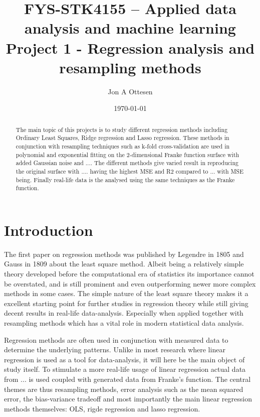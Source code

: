 \documentclass[uio,jmp,amsmath,amssymb,reprint]{revtex4-1}
\numberwithin{equation}{section}
\begin{document}
\title{FYS-STK4155 – Applied data analysis and machine learning\\ Project 1 - Regression analysis and resampling methods}%

\author{Jon A Ottesen}
\date{\today}

\begin{abstract}
The main topic of this projects is to study different regression methods including Ordinary Least Squares, Ridge regression and Lasso regression. These methods in conjunction with resampling techniques such as k-fold cross-validation are used in polynomial and exponential fitting on the 2-dimensional Franke function surface with added Gaussian noise and .... The different methods give varied result in reproducing the original surface with .... having the highest MSE and R2 compared to ... with MSE being. Finally real-life data is the analysed using the same techniques as the Franke function.

\end{abstract}

\maketitle


\section{Introduction}\label{sec:Introduction}

The first paper on regression methods was published by Legendre in 1805 and Gauss in 1809 about the least square method\cite{wiki:Regression_analysis}. Albeit being a relatively simple theory developed before the computational era of statistics its importance cannot be overstated, and is still prominent and even outperforming newer more complex methods in some cases. The simple nature of the least square theory makes it a excellent starting point for further studies in regression theory while still giving decent results in real-life data-analysis. Especially when applied together with resampling methods which has a vital role in modern statistical data analysis.

Regression methods are often used in conjunction with measured data to determine the underlying patterns. Unlike in most research where linear regression is used as a tool for data-analysis, it will here be the main object of study itself. To stimulate a more real-life usage of linear regression actual data from ... is used coupled with generated data from  Franke's function. The central themes are thus resampling methods, error analysis such as the mean squared error, the bias-variance tradeoff and most importantly the main linear regression methods themselves: OLS, rigde regression and lasso regression.
\end{document}
